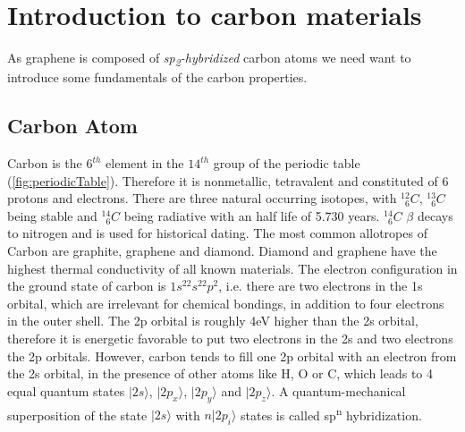 \chapter{Introduction to carbon materials}
	As graphene is composed of \textit{sp\textsubscript{2}-hybridized} carbon atoms we need want to introduce some fundamentals of the carbon properties.
	\section{Carbon Atom}
		Carbon is the $6^{th}$ element in the $14^{th}$ group of the periodic table (\ref{fig:periodicTable}). Therefore it is nonmetallic, tetravalent and constituted of 6 protons and electrons. There are three natural occurring isotopes, with $^{12}_{\phantom{0}6}C$, $^{13}_{\phantom{0}6}C$ being stable and $^{14}_{\phantom{0}6}C$ being radiative with an half life of 5.730 years. $^{14}_{\phantom{0}6}C$ $\beta$ decays to nitrogen and is used for historical dating. 
		The most common allotropes of Carbon are graphite, graphene and diamond. Diamond and graphene have the highest thermal conductivity of all known materials. The electron configuration in the ground state of carbon is $1s^22s^22p^2$, i.e. there are two electrons in the 1s orbital, which are irrelevant for chemical bondings, in addition to four electrons in the outer shell. The 2p orbital is roughly 4eV higher than the 2s orbital, therefore it is energetic favorable to put two electrons in the 2s and two electrons the 2p orbitals. However, carbon tends to fill one 2p orbital with an electron from the 2s orbital, in the presence of other atoms like H, O or C, which leads to 4 equal quantum states $|2s \rangle$, $|2p_x \rangle$, $|2p_y \rangle$ and $|2p_z \rangle$. A quantum-mechanical superposition of the state $|2s \rangle$ with $n |2p_i \rangle$ states is called sp\textsuperscript{n} hybridization.
